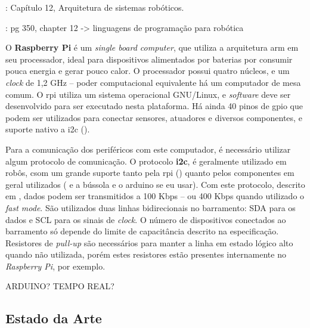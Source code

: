 
\cite{siciliano2016springer}: Capítulo 12, Arquitetura de sistemas robóticos.

\cite{craig2017introduction}: pg 350, chapter 12 -> linguagens de programação para robótica

O \textbf{Raspberry Pi} é um \emph{single board computer}, que utiliza a arquitetura \acrshort{arm} em seu processador, ideal para dispositivos alimentados por baterias por consumir pouca energia e gerar pouco calor. O processador possui quatro núcleos, e um \emph{clock} de 1,2 GHz -- poder computacional equivalente há um computador de mesa comum. O \acrshort{rpi} utiliza um sistema operacional GNU/Linux, e \emph{software} deve ser desenvolvido para ser executado nesta plataforma. Há ainda 40 pinos de \acrshort{gpio} que podem ser utilizados para conectar sensores, atuadores e diversos componentes, e suporte nativo a \acrshort{i2c} (\cite{upton2014raspberry}).


Para a comunicação dos periféricos com este computador, é necessário utilizar algum protocolo de comunicação. O protocolo \textbf{\acrlong{i2c}}, é geralmente utilizado em robôs, csom um grande suporte tanto pela \acrshort{rpi} (\cite{upton2014raspberry}) quanto pelos componentes em geral utilizados (\cite{MPU6050} e a bússola e o arduino se eu usar). Com este protocolo, descrito em \cite{semiconductors2000i2c}, dados podem ser transmitidos a 100 Kbps -- ou 400 Kbps quando utilizado o \emph{fast mode}. São utilizados duas linhas bidirecionais no barramento: SDA para os dados e SCL para os sinais de \emph{clock}. O número de dispositivos conectados ao barramento só depende do limite de capacitância descrito na especificação. Resistores de \emph{pull-up} são necessários para manter a linha em estado lógico alto quando não utilizada, porém estes resistores estão presentes internamente no \emph{Raspberry Pi}, por exemplo.

ARDUINO? TEMPO REAL?

\subsection{Estado da Arte}


